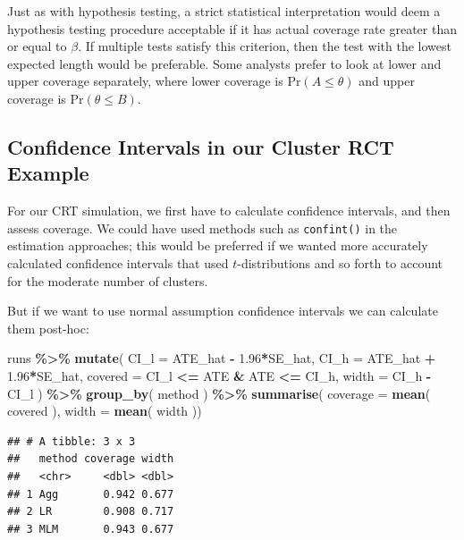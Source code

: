 \documentclass[
]{book}
\newenvironment{Shaded}{\begin{snugshade}}{\end{snugshade}}
\newcommand{\AttributeTok}[1]{\textcolor[rgb]{0.13,0.29,0.53}{#1}}
\newcommand{\FloatTok}[1]{\textcolor[rgb]{0.00,0.00,0.81}{#1}}
\newcommand{\FunctionTok}[1]{\textcolor[rgb]{0.13,0.29,0.53}{\textbf{#1}}}
\newcommand{\NormalTok}[1]{#1}
\newcommand{\SpecialCharTok}[1]{\textcolor[rgb]{0.81,0.36,0.00}{\textbf{#1}}}
\begin{document}
Just as with hypothesis testing, a strict statistical interpretation would deem a hypothesis testing procedure acceptable if it has actual coverage rate greater than or equal to \(\beta\).
If multiple tests satisfy this criterion, then the test with the lowest expected length would be preferable. Some analysts prefer to look at lower and upper coverage separately, where lower coverage is \(\text{Pr}(A \leq \theta)\) and upper coverage is \(\text{Pr}(\theta \leq B)\).

\subsection{Confidence Intervals in our Cluster RCT Example}\label{confidence-intervals-in-our-cluster-rct-example}

For our CRT simulation, we first have to calculate confidence intervals, and then assess coverage.
We could have used methods such as \texttt{confint()} in the estimation approaches; this would be preferred if we wanted more accurately calculated confidence intervals that used \(t\)-distributions and so forth to account for the moderate number of clusters.

But if we want to use normal assumption confidence intervals we can calculate them post-hoc:

\begin{Shaded}
\begin{Highlighting}[]
\NormalTok{runs }\SpecialCharTok{\%\textgreater{}\%} \FunctionTok{mutate}\NormalTok{( }\AttributeTok{CI\_l =}\NormalTok{ ATE\_hat }\SpecialCharTok{{-}} \FloatTok{1.96}\SpecialCharTok{*}\NormalTok{SE\_hat,}
                 \AttributeTok{CI\_h =}\NormalTok{ ATE\_hat }\SpecialCharTok{+} \FloatTok{1.96}\SpecialCharTok{*}\NormalTok{SE\_hat,}
                 \AttributeTok{covered =}\NormalTok{ CI\_l }\SpecialCharTok{\textless{}=}\NormalTok{ ATE }\SpecialCharTok{\&}\NormalTok{ ATE }\SpecialCharTok{\textless{}=}\NormalTok{ CI\_h,}
                 \AttributeTok{width =}\NormalTok{ CI\_h }\SpecialCharTok{{-}}\NormalTok{ CI\_l ) }\SpecialCharTok{\%\textgreater{}\%}
  \FunctionTok{group\_by}\NormalTok{( method ) }\SpecialCharTok{\%\textgreater{}\%}
  \FunctionTok{summarise}\NormalTok{( }\AttributeTok{coverage =} \FunctionTok{mean}\NormalTok{( covered ),}
             \AttributeTok{width =} \FunctionTok{mean}\NormalTok{( width ))}
\end{Highlighting}
\end{Shaded}

\begin{verbatim}
## # A tibble: 3 x 3
##   method coverage width
##   <chr>     <dbl> <dbl>
## 1 Agg       0.942 0.677
## 2 LR        0.908 0.717
## 3 MLM       0.943 0.677
\end{verbatim}
\end{document}
